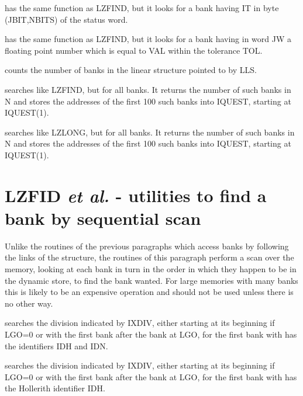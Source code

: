 
has the same function as LZFIND,
but it looks for a bank having IT in byte (JBIT,NBITS)
of the status word.


has the same function as LZFIND,
but it looks for a bank having in word JW a floating point number
which is equal to VAL within the tolerance TOL.


counts the number of banks in the linear
structure pointed to by LLS.


searches like LZFIND, but for all banks.
It returns the number of such banks in N
and stores the addresses of the first 100 such banks into IQUEST,
starting at IQUEST(1).


searches like LZLONG, but for all banks.
It returns the number of such banks in N
and stores the addresses of the first 100 such banks into IQUEST,
starting at IQUEST(1).

\section{LZFID {\it et al.} - utilities to find a bank by sequential scan}

Unlike the routines of the previous paragraphs which access
banks by following the links of the structure,
the routines of this paragraph perform a scan over the memory,
looking at each bank in turn in the order in which they happen
to be in the dynamic store,
to find the bank wanted.
For large memories with many banks this is likely to be an expensive
operation and should not be used unless there is no other way.



searches the division indicated by IXDIV, either starting
at its beginning if LGO=0 or with the first bank after the bank
at LGO, for the first bank with has the identifiers IDH and IDN.



searches the division indicated by IXDIV, either starting
at its beginning if LGO=0 or with the first bank after the bank
at LGO, for the first bank with has the Hollerith identifier IDH.


